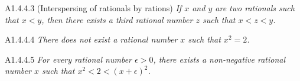 \begin{proposition}{A1.4.4.3}
    (Interspersing of rationals by rations) \emph{If $x$ and $y$ are two rationals
    such that $x < y$, then there exists a third rational number $z$ such that $x < z < y$.}
\end{proposition}

\begin{proposition}{A1.4.4.4}
    \emph{There does not exist a rational number $x$ such that $x^2 = 2$.}
\end{proposition}

\begin{proposition}{A1.4.4.5}
    \emph{For every rational number $\epsilon > 0$, there exists a non-negative
    rational number $x$ such that $x^2 < 2 < (x + \epsilon)^2$.}
\end{proposition}

